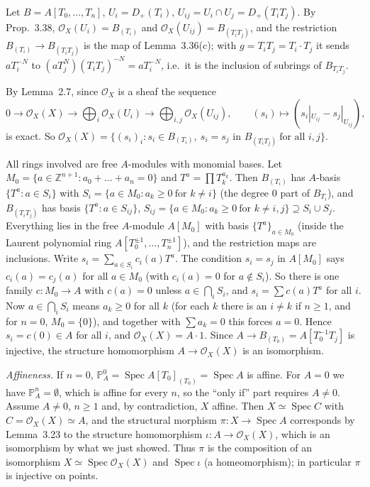 \documentclass[11pt]{article}
\begin{document}
\pf
Let $B=A[T_0,\dots,T_n]$, $U_i=D_+(T_i)$, $U_{ij}=U_i\cap U_j=D_+(T_iT_j)$. By Prop.~3.38, $\mathcal{O}_X(U_i)=B_{(T_i)}$ and $\mathcal{O}_X(U_{ij})=B_{(T_iT_j)}$, and the restriction $B_{(T_i)}\to B_{(T_iT_j)}$ is the map of Lemma~3.36(c); with $g=T_iT_j=T_i\cdot T_j$ it sends $aT_i^{-N}$ to $(aT_j^N)(T_iT_j)^{-N}=aT_i^{-N}$, i.e.\ it is the inclusion of subrings of $B_{T_iT_j}$.

By Lemma~2.7, since $\mathcal{O}_X$ is a sheaf the sequence
\[ 0\to\mathcal{O}_X(X)\to\bigoplus_i\mathcal{O}_X(U_i)\to\bigoplus_{i,j}\mathcal{O}_X(U_{ij}),\qquad (s_i)\mapsto(s_i|_{U_{ij}}-s_j|_{U_{ij}}), \]
is exact. So $\mathcal{O}_X(X)=\{(s_i)_i:s_i\in B_{(T_i)},\ s_i=s_j\text{ in }B_{(T_iT_j)}\ \text{for all }i,j\}$.

All rings involved are free $A$-modules with monomial bases. Let $M_0=\{a\in\mathbb{Z}^{n+1}:a_0+\dots+a_n=0\}$ and $T^a=\prod T_k^{a_k}$. Then $B_{(T_i)}$ has $A$-basis $\{T^a:a\in S_i\}$ with $S_i=\{a\in M_0:a_k\geq0\ \text{for }k\neq i\}$ (the degree $0$ part of $B_{T_i}$), and $B_{(T_iT_j)}$ has basis $\{T^a:a\in S_{ij}\}$, $S_{ij}=\{a\in M_0:a_k\geq0\ \text{for }k\neq i,j\}\supseteq S_i\cup S_j$. Everything lies in the free $A$-module $A[M_0]$ with basis $\{T^a\}_{a\in M_0}$ (inside the Laurent polynomial ring $A[T_0^{\pm1},\dots,T_n^{\pm1}]$), and the restriction maps are inclusions. Write $s_i=\sum_{a\in S_i}c_i(a)T^a$. The condition $s_i=s_j$ in $A[M_0]$ says $c_i(a)=c_j(a)$ for all $a\in M_0$ (with $c_i(a)=0$ for $a\notin S_i$). So there is one family $c:M_0\to A$ with $c(a)=0$ unless $a\in\bigcap_iS_i$, and $s_i=\sum c(a)T^a$ for all $i$. Now $a\in\bigcap_iS_i$ means $a_k\geq0$ for all $k$ (for each $k$ there is an $i\neq k$ if $n\geq1$, and for $n=0$, $M_0=\{0\}$), and together with $\sum a_k=0$ this forces $a=0$. Hence $s_i=c(0)\in A$ for all $i$, and $\mathcal{O}_X(X)=A\cdot1$. Since $A\to B_{(T_0)}=A[T_0^{-1}T_j]$ is injective, the structure homomorphism $A\to\mathcal{O}_X(X)$ is an isomorphism.

\emph{Affineness.} If $n=0$, $\mathbb{P}^0_A=\operatorname{Spec}A[T_0]_{(T_0)}=\operatorname{Spec}A$ is affine. For $A=0$ we have $\mathbb{P}^n_A=\emptyset$, which is affine for every $n$, so the ``only if'' part requires $A\neq0$. Assume $A\neq0$, $n\geq1$ and, by contradiction, $X$ affine. Then $X\simeq\operatorname{Spec}C$ with $C=\mathcal{O}_X(X)\simeq A$, and the structural morphism $\pi:X\to\operatorname{Spec}A$ corresponds by Lemma~3.23 to the structure homomorphism $\iota:A\to\mathcal{O}_X(X)$, which is an isomorphism by what we just showed. Thus $\pi$ is the composition of an isomorphism $X\simeq\operatorname{Spec}\mathcal{O}_X(X)$ and $\operatorname{Spec}\iota$ (a homeomorphism); in particular $\pi$ is injective on points.
\end{document}
